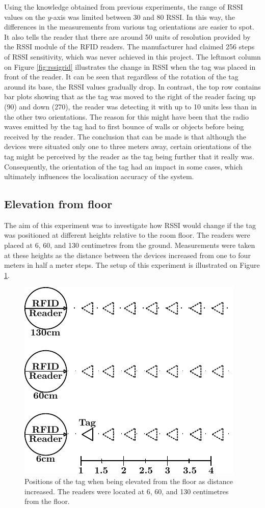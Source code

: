 Using the knowledge obtained from previous experiments, the range of RSSI values on the $y$-axis was limited between 30 and 80 RSSI. In this way, the differences in the measurements from various tag orientations are easier to spot. It also tells the reader that there are around 50 units of resolution provided by the RSSI module of the RFID readers. The manufacturer had claimed 256 steps of RSSI sensitivity, which was never achieved in this project. The leftmost column on Figure \ref{fig:rssigrid} illustrates the change in RSSI when the tag was placed in front of the reader. It can be seen that regardless of the rotation of the tag around its base, the RSSI values gradually drop. In contrast, the top row contains bar plots showing that as the tag was moved to the right of the reader facing up (90\textdegree) and down (270\textdegree), the reader was detecting it with up to 10 units less than in the other two orientations. The reason for this might have been that the radio waves emitted by the tag had to first bounce of walls or objects before being received by the reader. The conclusion that can be made is that although the devices were situated only one to three meters away, certain orientations of the tag might be perceived by the reader as the tag being further that it really was. Consequently, the orientation of the tag had an impact in some cases, which ultimately influences the localisation accuracy of the system.


\subsection{Elevation from floor}

The aim of this experiment was to investigate how RSSI would change if the tag was positioned at different heights relative to the room floor. The readers were placed at 6, 60, and 130 centimetres from the ground. Measurements were taken at these heights as the distance between the devices increased from one to four meters in half a meter steps. The setup of this experiment is illustrated on Figure \ref{fig:ele}.
\begin{figure}[h]
	\begin{center}
		\includegraphics[width=.4\textwidth]{figures/exp/elevation}
		\caption{Positions of the tag when being elevated from the floor as distance increased. The readers were located at 6, 60, and 130 centimetres from the floor.}
		\label{fig:ele}
	\end{center}
\end{figure}

